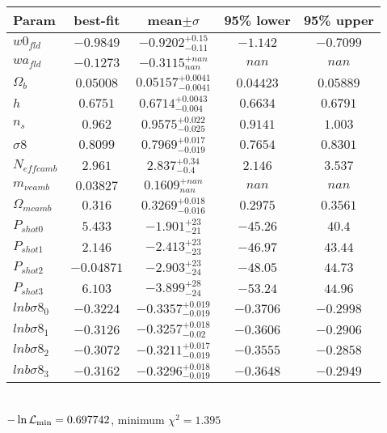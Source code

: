 \begin{tabular}{|l|c|c|c|c|} 
 \hline 
Param & best-fit & mean$\pm\sigma$ & 95\% lower & 95\% upper \\ \hline 
$w0_{fld }$ &$-0.9849$ & $-0.9202_{-0.11}^{+0.15}$ & $-1.142$ & $-0.7099$ \\ 
$wa_{fld }$ &$-0.1273$ & $-0.3115_{nan}^{+nan}$ & $nan$ & $nan$ \\ 
$\Omega_{b }$ &$0.05008$ & $0.05157_{-0.0041}^{+0.0041}$ & $0.04423$ & $0.05889$ \\ 
$h$ &$0.6751$ & $0.6714_{-0.004}^{+0.0043}$ & $0.6634$ & $0.6791$ \\ 
$n_{s }$ &$0.962$ & $0.9575_{-0.025}^{+0.022}$ & $0.9141$ & $1.003$ \\ 
$\sigma8$ &$0.8099$ & $0.7969_{-0.019}^{+0.017}$ & $0.7654$ & $0.8301$ \\ 
$N_{eff camb }$ &$2.961$ & $2.837_{-0.4}^{+0.34}$ & $2.146$ & $3.537$ \\ 
$m_{\nu camb }$ &$0.03827$ & $0.1609_{nan}^{+nan}$ & $nan$ & $nan$ \\ 
$\Omega_{m camb }$ &$0.316$ & $0.3269_{-0.016}^{+0.018}$ & $0.2975$ & $0.3561$ \\ 
$P_{shot0 }$ &$5.433$ & $-1.901_{-21}^{+23}$ & $-45.26$ & $40.4$ \\ 
$P_{shot1 }$ &$2.146$ & $-2.413_{-23}^{+23}$ & $-46.97$ & $43.44$ \\ 
$P_{shot2 }$ &$-0.04871$ & $-2.903_{-24}^{+23}$ & $-48.05$ & $44.73$ \\ 
$P_{shot3 }$ &$6.103$ & $-3.899_{-24}^{+28}$ & $-53.24$ & $44.96$ \\ 
$lnb\sigma8_{0 }$ &$-0.3224$ & $-0.3357_{-0.019}^{+0.019}$ & $-0.3706$ & $-0.2998$ \\ 
$lnb\sigma8_{1 }$ &$-0.3126$ & $-0.3257_{-0.02}^{+0.018}$ & $-0.3606$ & $-0.2906$ \\ 
$lnb\sigma8_{2 }$ &$-0.3072$ & $-0.3211_{-0.019}^{+0.017}$ & $-0.3555$ & $-0.2858$ \\ 
$lnb\sigma8_{3 }$ &$-0.3162$ & $-0.3296_{-0.019}^{+0.018}$ & $-0.3648$ & $-0.2949$ \\ 
\hline 
 \end{tabular} \\ 
$-\ln{\cal L}_\mathrm{min} =0.697742$, minimum $\chi^2=1.395$ \\ 
